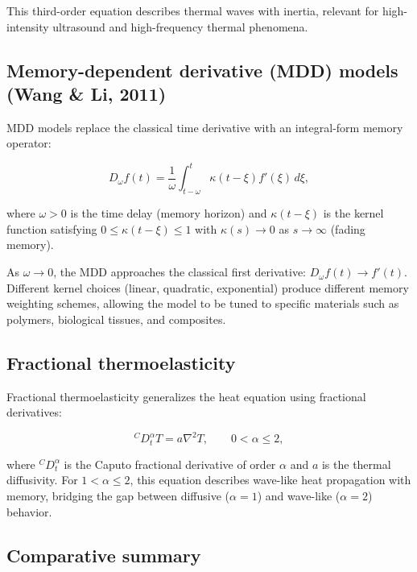 This third-order equation describes thermal waves with inertia, relevant for high-intensity ultrasound and high-frequency thermal phenomena.

\subsection{Memory-dependent derivative (MDD) models (Wang \& Li, 2011)}
\label{sec:4.10}

MDD models replace the classical time derivative with an integral-form memory operator:

\begin{equation}
D_\omega f(t) = \frac{1}{\omega}\int_{t-\omega}^{t} \kappa(t-\xi) f'(\xi)\,d\xi,
\label{eq:4.19}
\end{equation}

where $\omega > 0$ is the time delay (memory horizon) and $\kappa(t-\xi)$ is the kernel function satisfying $0 \leq \kappa(t-\xi) \leq 1$ with $\kappa(s) \to 0$ as $s \to \infty$ (fading memory).

As $\omega \to 0$, the MDD approaches the classical first derivative: $D_\omega f(t) \to f'(t)$. Different kernel choices (linear, quadratic, exponential) produce different memory weighting schemes, allowing the model to be tuned to specific materials such as polymers, biological tissues, and composites.

\subsection{Fractional thermoelasticity}
\label{sec:4.11}

Fractional thermoelasticity generalizes the heat equation using fractional derivatives:

\begin{equation}
{}^C D_t^\alpha T = a\nabla^2 T, \qquad 0 < \alpha \leq 2,
\label{eq:4.20}
\end{equation}

where ${}^C D_t^\alpha$ is the Caputo fractional derivative of order $\alpha$ and $a$ is the thermal diffusivity. For $1 < \alpha \leq 2$, this equation describes wave-like heat propagation with memory, bridging the gap between diffusive ($\alpha = 1$) and wave-like ($\alpha = 2$) behavior.

\subsection{Comparative summary}
\label{sec:4.12}

